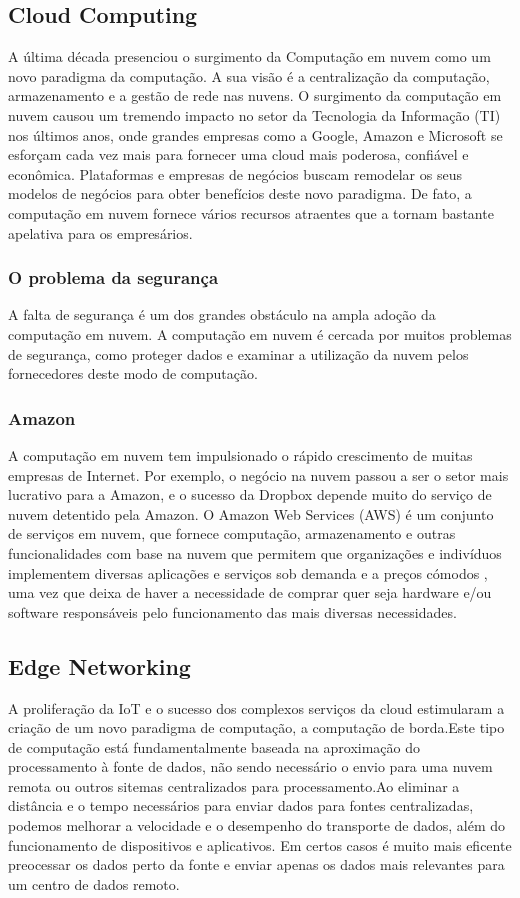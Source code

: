 \documentclass{llncs}
\begin{document}
\subsection{Cloud Computing}

A última década presenciou o surgimento da Computação em nuvem como um novo paradigma da computação. A sua visão é a centralização da computação, armazenamento e a gestão de rede nas nuvens.\cite{3}
O surgimento da computação em nuvem causou um tremendo impacto no setor da Tecnologia da Informação (TI) nos últimos anos, onde grandes empresas como a Google, Amazon e Microsoft se esforçam cada vez mais para fornecer uma cloud mais poderosa, confiável e econômica. Plataformas e empresas de negócios buscam remodelar os seus modelos de negócios para obter benefícios deste novo paradigma. De fato, a computação em nuvem fornece vários recursos atraentes que a tornam bastante apelativa para os empresários.\cite{4}

\subsubsection{O problema da segurança}
A falta de segurança é um dos grandes obstáculo na ampla adoção da computação em nuvem. A computação em nuvem é cercada por muitos problemas de segurança, como proteger dados e examinar a utilização da nuvem pelos fornecedores deste modo de computação.\cite{5}

\subsubsection{Amazon}
A computação em nuvem tem impulsionado o rápido crescimento de muitas empresas de Internet. Por exemplo, o negócio na nuvem passou a ser o setor mais lucrativo para a Amazon, e o sucesso da Dropbox depende muito do serviço de nuvem detentido pela Amazon.\cite{3}
O Amazon Web Services (AWS) é um conjunto de serviços em nuvem, que fornece computação, armazenamento e outras funcionalidades com base na nuvem que permitem que organizações e indivíduos implementem diversas aplicações e serviços sob demanda e a preços cómodos \cite{4}, uma vez que deixa de haver a necessidade de comprar quer seja hardware e/ou software responsáveis pelo funcionamento das mais diversas necessidades. \cite{6}

\subsection{Edge Networking}
A proliferação da IoT e o sucesso dos complexos serviços da cloud estimularam a criação de um novo paradigma de computação, a computação de borda.\cite{7}Este tipo de computação está fundamentalmente baseada na aproximação do processamento à fonte de dados, não sendo necessário o envio para uma nuvem remota ou outros sitemas centralizados para processamento.Ao eliminar a distância e o tempo necessários para enviar dados para fontes centralizadas, podemos melhorar a velocidade e o desempenho do transporte de dados, além do funcionamento de dispositivos e aplicativos. \cite{1}Em certos casos é muito mais eficente preocessar os dados perto da fonte e enviar apenas os dados mais relevantes para um centro de dados remoto.
\end{document}
